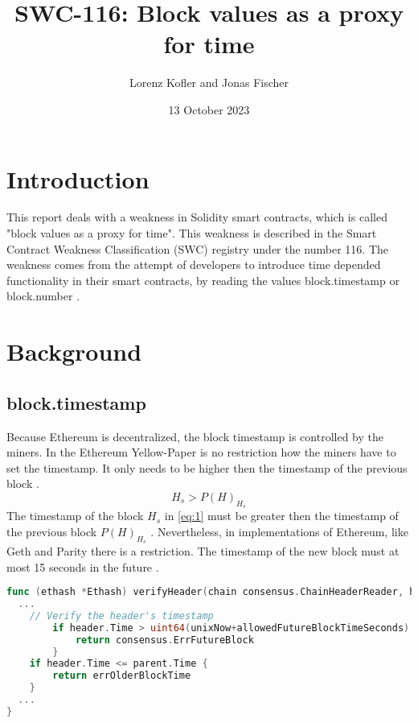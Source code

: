 \documentclass{article}
\title{SWC-116: Block values as a proxy for time}
\author{Lorenz Kofler and Jonas Fischer}
\date{13 October 2023}
\begin{document}
\maketitle
\tableofcontents
\newpage

\section{Introduction}
This report deals with a weakness in Solidity smart contracts, which is called
"block values as a proxy for time". This weakness is described in the Smart
Contract Weakness Classification (SWC) registry under the number 116. \newline
The weakness comes from the attempt of developers to introduce time depended
functionality in their smart contracts, by reading the values block.timestamp
or block.number \cite{swc116}. \newline

\section{Background}
\subsection{block.timestamp}

Because Ethereum is decentralized, the block timestamp is controlled by the
miners. In the Ethereum Yellow-Paper is no restriction how the miners have to set the timestamp. It
only needs to be higher then the timestamp of the previous block \cite{Conkas2021}.
\begin{equation} \label{eq:1}
H_s > P(H)_{H_s}
\end{equation}
The timestamp of the block $H_s$ in \ref{eq:1} must be greater then the timestamp of the previous block $P(H)_{H_s}$ \cite{ethyellowpaper2023}.
Nevertheless, in implementations of Ethereum, like Geth and Parity there is a restriction. The timestamp of the new block
must at most 15 seconds in the future \cite{Conkas2021}. \newline

\begin{lstlisting}[language=go, caption="The restriction for the timestamp in Geth. Source: consensus/ethash/consensus.go \cite{timestamp_code}"]
func (ethash *Ethash) verifyHeader(chain consensus.ChainHeaderReader, header, parent *types.Header, uncle bool, unixNow int64) error {
  ...
	// Verify the header's timestamp
		if header.Time > uint64(unixNow+allowedFutureBlockTimeSeconds) {
			return consensus.ErrFutureBlock
		}
	if header.Time <= parent.Time {
		return errOlderBlockTime
	}
  ...
}
\end{lstlisting}
\end{document}
